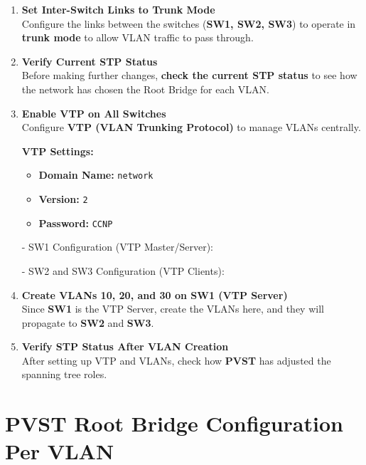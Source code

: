 \documentclass[a4paper]{book}
\begin{document}
\begin{enumerate}

    \item \textbf{Set Inter-Switch Links to Trunk Mode} \\
    Configure the links between the switches (\textbf{SW1, SW2, SW3}) to operate in \textbf{trunk mode} to allow VLAN traffic to pass through.
    
    
    \item \textbf{Verify Current STP Status} \\
    Before making further changes, \textbf{check the current STP status} to see how the network has chosen the Root Bridge for each VLAN.
    

    \item \textbf{Enable VTP on All Switches} \\
    Configure \textbf{VTP (VLAN Trunking Protocol)} to manage VLANs centrally.
    
    \textbf{VTP Settings:}
    \begin{itemize}
        \item \textbf{Domain Name:} \texttt{network}
        \item \textbf{Version:} \texttt{2}
        \item \textbf{Password:} \texttt{CCNP}
    \end{itemize}


    - SW1 Configuration (VTP Master/Server):


    - SW2 and SW3 Configuration (VTP Clients):


    \item \textbf{Create VLANs 10, 20, and 30 on SW1 (VTP Server)} \\
    Since \textbf{SW1} is the VTP Server, create the VLANs here, and they will propagate to \textbf{SW2} and \textbf{SW3}.
    

    \item \textbf{Verify STP Status After VLAN Creation} \\
    After setting up VTP and VLANs, check how \textbf{PVST} has adjusted the spanning tree roles.

\end{enumerate}

\section*{PVST Root Bridge Configuration Per VLAN}
\end{document}
